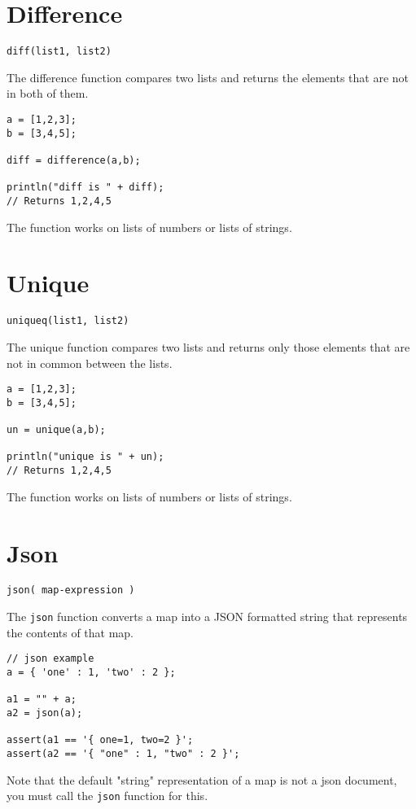 \section{Difference}
\begin{Verbatim}
diff(list1, list2)
\end{Verbatim}
The difference function compares two lists and returns the elements that are not in both of them.
\begin{lstlisting}[caption={Difference example}]
a = [1,2,3];
b = [3,4,5];

diff = difference(a,b);

println("diff is " + diff);
// Returns 1,2,4,5
\end{lstlisting}
The function works on lists of numbers or lists of strings.
\section{Unique}
\begin{Verbatim}
uniqueq(list1, list2)
\end{Verbatim}
The unique function compares two lists and returns only those elements that are not in common between the lists.
\begin{lstlisting}[caption={Unique example}]
a = [1,2,3];
b = [3,4,5];

un = unique(a,b);

println("unique is " + un);
// Returns 1,2,4,5 
\end{lstlisting}
The function works on lists of numbers or lists of strings.
\section{Json}
\begin{Verbatim}
json( map-expression )
\end{Verbatim}

The \Verb+json+ function converts a map into a JSON formatted string that represents the contents of that map.

\begin{lstlisting}[caption={Json example}]
// json example
a = { 'one' : 1, 'two' : 2 };

a1 = "" + a;
a2 = json(a);

assert(a1 == '{ one=1, two=2 }';
assert(a2 == '{ "one" : 1, "two" : 2 }';
\end{lstlisting}

Note that the default "string" representation of a map is not a json document, you must call the \Verb+json+ function for this.

